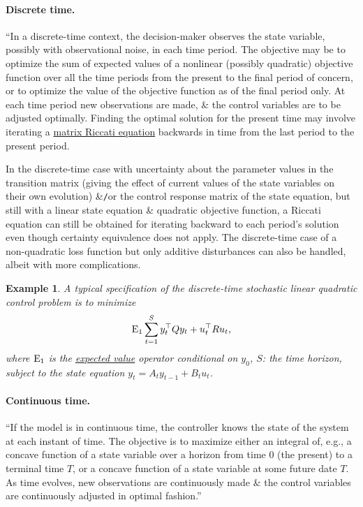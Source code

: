 \documentclass{article}
\newtheorem{example}{Example}
\begin{document}
\paragraph{Discrete time.} ``In a discrete-time context, the decision-maker observes the state variable, possibly with observational noise, in each time period. The objective may be to optimize the sum of expected values of a nonlinear (possibly quadratic) objective function over all the time periods from the present to the final period of concern, or to optimize the value of the objective function as of the final period only. At each time period new observations are made, \& the control variables are to be adjusted optimally. Finding the optimal solution for the present time may involve iterating a \href{https://en.wikipedia.org/wiki/Linear-quadratic-Gaussian_control#Discrete_time}{matrix Riccati equation} backwards in time from the last period to the present period.

In the discrete-time case with uncertainty about the parameter values in the transition matrix (giving the effect of current values of the state variables on their own evolution) \&{\tt/}or the control response matrix of the state equation, but still with a linear state equation \& quadratic objective function, a Riccati equation can still be obtained for iterating backward to each period's solution even though certainty equivalence does not apply. The discrete-time case of a non-quadratic loss function but only additive disturbances can also be handled, albeit with more complications.

\begin{example}
	A typical specification of the discrete-time stochastic linear quadratic control problem is to minimize
	\begin{equation}
		{\rm E}_1\sum_{t=1}^S y_t^\top Qy_t + u_t^\top Ru_t,
	\end{equation}
	where ${\rm E}_1$ is the \href{https://en.wikipedia.org/wiki/Expected_value}{expected value} operator conditional on $y_0$, $S$: the time horizon, subject to the state equation $y_t = A_ty_{t-1} + B_tu_t$.
\end{example}

\paragraph{Continuous time.} ``If the model is in continuous time, the controller knows the state of the system at each instant of time. The objective is to maximize either an integral of, e.g., a concave function of a state variable over a horizon from time 0 (the present) to a terminal time $T$, or a concave function of a state variable at some future date $T$. As time evolves, new observations are continuously made \& the control variables are continuously adjusted in optimal fashion.''
\end{document}
